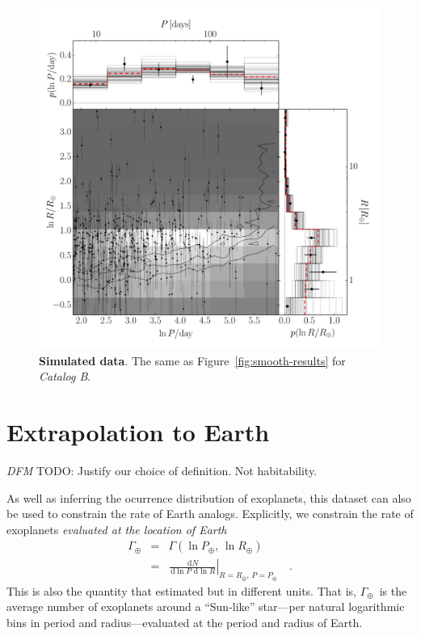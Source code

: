 \documentclass[12pt,preprint]{aastex}
\newcommand{\Fig}[1]{Figure~\ref{fig:#1}}
\newcommand{\fig}[1]{\Fig{#1}}
\newcommand{\figlabel}[1]{\label{fig:#1}}
\newcommand{\sectlabel}[1]{\label{sect:#1}}
\newcommand{\dd}{\ensuremath{\,\mathrm{d}}}
\newcommand{\todo}[3]{{\color{#2} \emph{#1} TODO: #3}}
\newcommand{\dfmtodo}[1]{\todo{DFM}{red}{#1}}
\newcommand{\rate}{\ensuremath{\Gamma}}
\newcommand{\radius}{\ensuremath{R}}
\newcommand{\period}{\ensuremath{P}}
\newcommand{\modelb}{\emph{Catalog B}}
\newcommand{\gammaearth}{{\ensuremath{\rate_\oplus}}}
\begin{document}
\begin{figure}[p]
\begin{center}
\includegraphics[width=\textwidth]{figures/simulation/results.pdf}
\end{center}
\caption{%
{\bf Simulated data}.
The same as \fig{smooth-results} for \modelb.
\figlabel{simulation-results}}
\end{figure}

\section{Extrapolation to Earth}
\sectlabel{extrap}

\dfmtodo{Justify our choice of definition. Not habitability.}

As well as inferring the ocurrence distribution of exoplanets, this dataset
can also be used to constrain the rate of Earth analogs.
Explicitly, we constrain the rate of exoplanets \emph{evaluated at the
location of Earth}
\begin{eqnarray}
\gammaearth &=& \rate (\ln\period_\oplus,\,\ln\radius_\oplus) \\
&=&
\left.\frac{\dd N}{\dd\ln\period\,\dd\ln\radius}\right|
_{\radius=\radius_\oplus,\,\period=\period_\oplus}\quad.
\end{eqnarray}
This is also the quantity that \citet{petigura} estimated but in different
units.
That is, \gammaearth\ is the average number of exoplanets around a
``Sun-like'' star---per natural logarithmic bins in period and
radius---evaluated at the period and radius of Earth.
\end{document}
